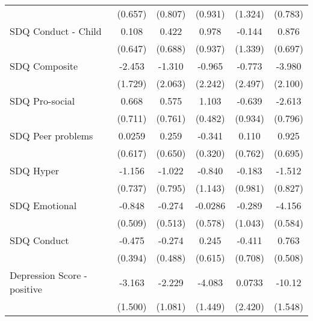 {\begin{tabular}{l*{5}{c}}
            &     (0.657)         &     (0.807)         &     (0.931)         &     (1.324)         &     (0.783)         \\
\addlinespace
SDQ Conduct - Child&       0.108         &       0.422         &       0.978         &      -0.144         &       0.876         \\
            &     (0.647)         &     (0.688)         &     (0.937)         &     (1.339)         &     (0.697)         \\
\addlinespace
SDQ Composite&      -2.453         &      -1.310         &      -0.965         &      -0.773         &      -3.980         \\
            &     (1.729)         &     (2.063)         &     (2.242)         &     (2.497)         &     (2.100)         \\
\addlinespace
SDQ Pro-social&       0.668         &       0.575         &       1.103\sym{*}  &      -0.639         &      -2.613\sym{**} \\
            &     (0.711)         &     (0.761)         &     (0.482)         &     (0.934)         &     (0.796)         \\
\addlinespace
SDQ Peer problems&      0.0259         &       0.259         &      -0.341         &       0.110         &       0.925         \\
            &     (0.617)         &     (0.650)         &     (0.320)         &     (0.762)         &     (0.695)         \\
\addlinespace
SDQ Hyper   &      -1.156         &      -1.022         &      -0.840         &      -0.183         &      -1.512         \\
            &     (0.737)         &     (0.795)         &     (1.143)         &     (0.981)         &     (0.827)         \\
\addlinespace
SDQ Emotional&      -0.848         &      -0.274         &     -0.0286         &      -0.289         &      -4.156\sym{***}\\
            &     (0.509)         &     (0.513)         &     (0.578)         &     (1.043)         &     (0.584)         \\
\addlinespace
SDQ Conduct &      -0.475         &      -0.274         &       0.245         &      -0.411         &       0.763         \\
            &     (0.394)         &     (0.488)         &     (0.615)         &     (0.708)         &     (0.508)         \\
\addlinespace
Depression Score - positive&      -3.163\sym{*}  &      -2.229\sym{*}  &      -4.083\sym{**} &      0.0733         &      -10.12\sym{***}\\
            &     (1.500)         &     (1.081)         &     (1.449)         &     (2.420)         &     (1.548)         \\
\bottomrule
\end{tabular}
}
